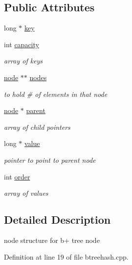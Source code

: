 \subsection*{Public Attributes}
\begin{DoxyCompactItemize}
\item 
long $\ast$ \hyperlink{class_btreehash_1_1node_a182c9bcbe6e1ff41356283ac57443a2d}{key}
\item 
int \hyperlink{class_btreehash_1_1node_ae63de61b2b8b73eb681cca40de41f7a9}{capacity}
\begin{DoxyCompactList}\small\item\em array of keys \end{DoxyCompactList}\item 
\hyperlink{class_btreehash_1_1node}{node} $\ast$$\ast$ \hyperlink{class_btreehash_1_1node_a0fe477a053d6f13eecbbf975cfca2707}{nodes}
\begin{DoxyCompactList}\small\item\em to hold \# of elements in that node \end{DoxyCompactList}\item 
\hyperlink{class_btreehash_1_1node}{node} $\ast$ \hyperlink{class_btreehash_1_1node_ae4f3ee150ef5664250371ef8c7287812}{parent}
\begin{DoxyCompactList}\small\item\em array of child pointers \end{DoxyCompactList}\item 
long $\ast$ \hyperlink{class_btreehash_1_1node_aa466b9c9e1315209f850a42d50115371}{value}
\begin{DoxyCompactList}\small\item\em pointer to point to parent node \end{DoxyCompactList}\item 
int \hyperlink{class_btreehash_1_1node_a6222a2bd19f802090d25f8ce8e5ea413}{order}
\begin{DoxyCompactList}\small\item\em array of values \end{DoxyCompactList}\end{DoxyCompactItemize}


\subsection{Detailed Description}
node structure for b+ tree node 

Definition at line 19 of file btreehash.\-cpp.



